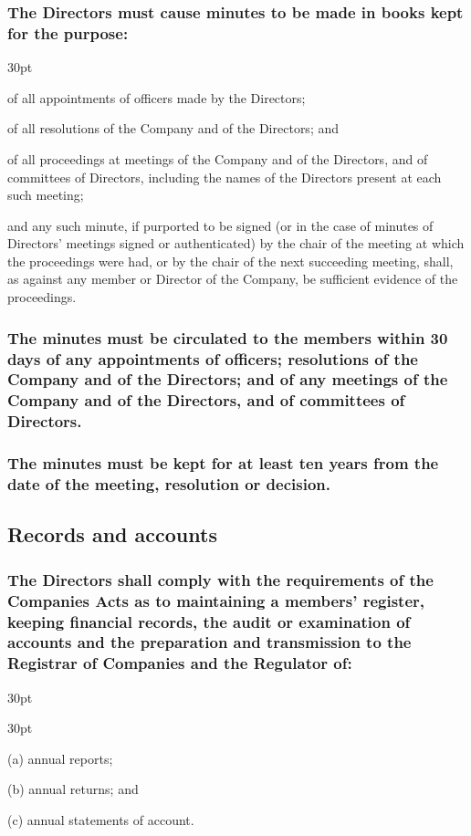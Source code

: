 \documentclass[12pt]{article}
\def\clauseindent{30pt}
\newenvironment{subindentpara}{\raggedright\begin{adjustwidth}{\clauseindent}{}\begin{hanginglist}}{\end{hanginglist}\end{adjustwidth}}
\newenvironment{subindentlist}{\raggedright\begin{adjustwidth}{\clauseindent}{}\begin{labeledlist}{\clauseindent}}{\end{labeledlist}\end{adjustwidth}}
\begin{document}
\subsubsection[Specifcs of records of minutes]{The Directors must cause minutes to be made in books kept for the purpose:}
\begin{subindentpara}
    \item of all appointments of officers made by the Directors;
    \item of all resolutions of the Company and of the Directors; and
    \item of all proceedings at meetings of the Company and of the Directors, and of committees of Directors, including the names of the Directors present at each such meeting;
    \item and any such minute, if purported to be signed (or in the case of minutes of Directors' meetings signed or authenticated) by the chair of the meeting at which the proceedings were had, or by the chair of the next succeeding meeting, shall, as against any member or Director of the Company, be sufficient evidence of the proceedings.
\end{subindentpara}
\subsubsection[Circulation of minutes]{The minutes must be circulated to the members within 30 days of any appointments of officers; resolutions of the Company and of the Directors; and of any meetings of the Company and of the Directors, and of committees of Directors.}
\subsubsection[Archives of minutes]{The minutes must be kept for at least ten years from the date of the meeting, resolution or decision.}

\subsection{Records and accounts}
\subsubsection[Specifcs of records and accounts]{The Directors shall comply with the requirements of the Companies Acts as to maintaining a members' register, keeping financial records, the audit or examination of accounts and the preparation and transmission to the Registrar of Companies and the Regulator of:}
\begin{subindentlist}
    \item [(a)] annual reports;
    \item [(b)] annual returns; and
    \item [(c)] annual statements of account.
\end{subindentlist}
\end{document}
